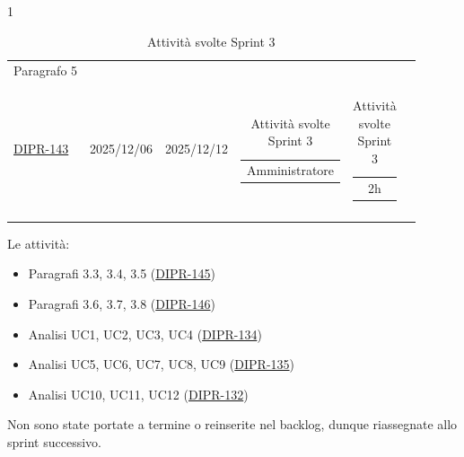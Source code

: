 \documentclass[a4paper,12pt]{article}
\begin{document}
\begin{table}[H]
\begin{spacing}{1}
\begin{longtable}{|p{4cm}|c|c|c|c|c|}
            \hline
            Paragrafo 5 & \begin{tabular}[c]{@{}c@{}} \href{https://7zpus.atlassian.net/browse/DIPR-147}{DIPR-147} \\\href{https://7zpus.atlassian.net/browse/DIPR-143}{DIPR-143} \end{tabular} & 2025/12/06 & 2025/12/12 & \begin{tabular}[c]{@{}c@{}} Amministratore \end{tabular} & \begin{tabular}[c]{@{}c@{}} \textcolor{green!50!black}{2h} \end{tabular} \\
            \hline
                \caption{Attività svolte Sprint 3}

    \end{longtable}
    \end{spacing}
\end{table}


Le attività:
\begin{itemize}
    \item Paragrafi 3.3, 3.4, 3.5 (\href{https://7zpus.atlassian.net/browse/DIPR-145}{DIPR-145})
    \item Paragrafi 3.6, 3.7, 3.8 (\href{https://7zpus.atlassian.net/browse/DIPR-146}{DIPR-146})
    \item Analisi UC1, UC2, UC3, UC4  (\href{https://7zpus.atlassian.net/browse/DIPR-134}{DIPR-134})
    \item Analisi UC5, UC6, UC7, UC8, UC9 (\href{https://7zpus.atlassian.net/browse/DIPR-135}{DIPR-135})
    \item Analisi UC10, UC11, UC12 (\href{https://7zpus.atlassian.net/browse/DIPR-132}{DIPR-132})
\end{itemize}
Non sono state portate a termine o reinserite nel backlog, dunque riassegnate allo sprint successivo.\\
\end{document}
